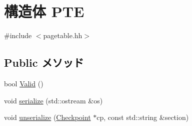 \hypertarget{structPowerISA_1_1PTE}{
\section{構造体 PTE}
\label{structPowerISA_1_1PTE}
}


{\ttfamily \#include $<$pagetable.hh$>$}\subsection*{Public メソッド}
\begin{DoxyCompactItemize}
\item 
bool \hyperlink{structPowerISA_1_1PTE_a62f0e274c1fe43a9411e2c6d3d144913}{Valid} ()
\item 
void \hyperlink{structPowerISA_1_1PTE_a53e036786d17361be4c7320d39c99b84}{serialize} (std::ostream \&os)
\item 
void \hyperlink{structPowerISA_1_1PTE_af22e5d6d660b97db37003ac61ac4ee49}{unserialize} (\hyperlink{classCheckpoint}{Checkpoint} $\ast$cp, const std::string \&section)
\end{DoxyCompactItemize}
